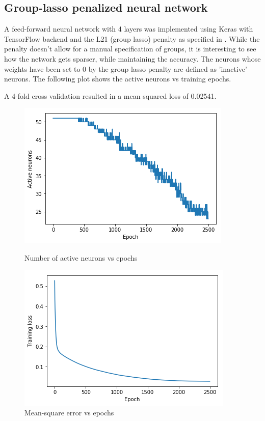 \documentclass[a4paper,12pt]{article}
\begin{document}
\newpage
\subsection{Group-lasso penalized neural network}
A feed-forward neural network with 4 layers was implemented using Keras with TensorFlow backend and the L21 (group lasso) penalty as specified in \cite{scardapane2017group}.
While the penalty doesn't allow for a manual specification of groups, it is interesting to see how the network gets sparser, while maintaining the accuracy. The neurons whose weights have been set to 0 by the group lasso penalty are defined as 'inactive' neurons. The following plot shows the active neurons vs training epochs.

A 4-fold cross validation resulted in a mean squared loss of 0.02541.
\begin{figure}[H]
 \centering
 \includegraphics[scale=0.7]{nn-sparse.png}
  \caption{Number of active neurons vs epochs}
  \label{fig:neurons}
  
  \includegraphics[scale=0.7]{loss.png}
  \caption{Mean-square error vs epochs}
  \label{fig:neurons}
\end{figure}
\end{document}
